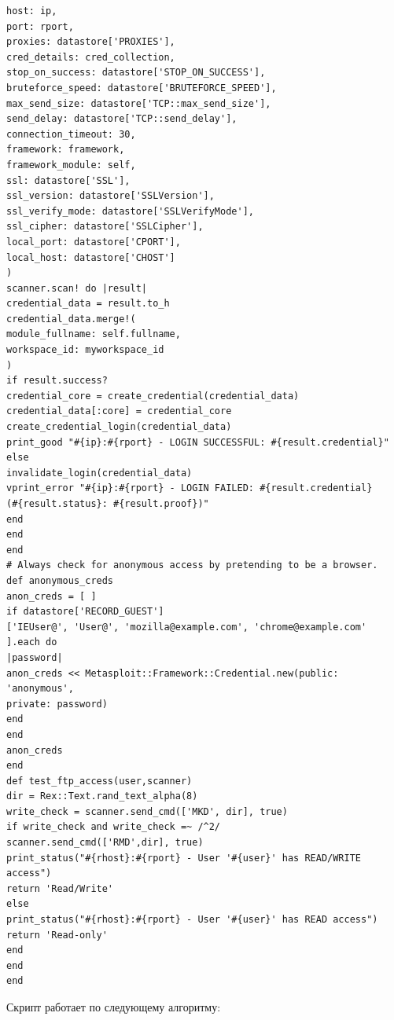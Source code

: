 \documentclass[10pt,a4paper]{report}
\begin{document}
\begin{lstlisting}
host: ip,
port: rport,
proxies: datastore['PROXIES'],
cred_details: cred_collection,
stop_on_success: datastore['STOP_ON_SUCCESS'],
bruteforce_speed: datastore['BRUTEFORCE_SPEED'],
max_send_size: datastore['TCP::max_send_size'],
send_delay: datastore['TCP::send_delay'],
connection_timeout: 30,
framework: framework,
framework_module: self,
ssl: datastore['SSL'],
ssl_version: datastore['SSLVersion'],
ssl_verify_mode: datastore['SSLVerifyMode'],
ssl_cipher: datastore['SSLCipher'],
local_port: datastore['CPORT'],
local_host: datastore['CHOST']
)
scanner.scan! do |result|
credential_data = result.to_h
credential_data.merge!(
module_fullname: self.fullname,
workspace_id: myworkspace_id
)
if result.success?
credential_core = create_credential(credential_data)
credential_data[:core] = credential_core
create_credential_login(credential_data)
print_good "#{ip}:#{rport} - LOGIN SUCCESSFUL: #{result.credential}"
else
invalidate_login(credential_data)
vprint_error "#{ip}:#{rport} - LOGIN FAILED: #{result.credential} 
(#{result.status}: #{result.proof})"
end
end
end
# Always check for anonymous access by pretending to be a browser.
def anonymous_creds
anon_creds = [ ]
if datastore['RECORD_GUEST']
['IEUser@', 'User@', 'mozilla@example.com', 'chrome@example.com' ].each do 
|password|
anon_creds << Metasploit::Framework::Credential.new(public: 'anonymous', 
private: password)
end
end
anon_creds
end
def test_ftp_access(user,scanner)
dir = Rex::Text.rand_text_alpha(8)
write_check = scanner.send_cmd(['MKD', dir], true)
if write_check and write_check =~ /^2/
scanner.send_cmd(['RMD',dir], true)
print_status("#{rhost}:#{rport} - User '#{user}' has READ/WRITE access")
return 'Read/Write'
else
print_status("#{rhost}:#{rport} - User '#{user}' has READ access")
return 'Read-only'
end
end
end
		\end{lstlisting}
		Скрипт работает по следующему алгоритму:
\end{document}
